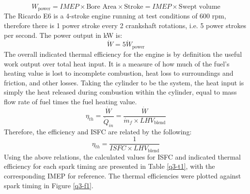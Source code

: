 \begin{equation}
    W_{\textrm{power}} = IMEP \times \textrm{Bore Area} \times \textrm{Stroke} = IMEP \times \textrm{Swept volume} \label{q3-4}
\end{equation}
The Ricardo E6 is a 4-stroke engine running at test conditions of 600 rpm, therefore there is 1 power stroke every 2 crankshaft rotations, i.e. 5 power strokes per second. The power output in \si{\kilo\watt} is:
\begin{equation}
    \dot{W} = 5\dot{W}_{\textrm{power}} \label{q3-5}
\end{equation}
The overall indicated thermal efficiency for the engine is by definition the useful work output over total heat input. It is a measure of how much of the fuel’s heating value is lost to incomplete combustion, heat loss to surroundings and friction, and other losses. Taking the cylinder to be the system, the heat input is simply the heat released during combustion within the cylinder, equal to mass flow rate of fuel times the fuel heating value.
\begin{equation}
    \eta_{th} = \frac{\dot{W}}{\dot{Q}_{in}} = \frac{\dot{W}}{\dot{m}_f \times LHV_{\textrm{blend}}} \label{q3-6}
\end{equation}
Therefore, the efficiency and ISFC are related by the following:
\begin{equation}
    \eta_{th} = \frac{1}{ISFC \times LHV_{\textrm{blend}}}
\end{equation}
Using the above relations, the calculated values for ISFC and indicated thermal efficiency for each spark timing are presented in Table \ref{q3-t1}, with the corresponding IMEP for reference. The thermal efficiencies were plotted against spark timing in Figure \ref{q3-f1}.
